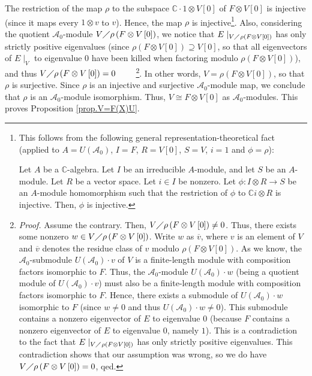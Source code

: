 \documentclass[etingof-lie.tex]{subfiles}
\begin{document}
The restriction of the map $\rho$ to the subspace $\mathbb{C}\cdot1\otimes
V\left[  0\right]  $ of $F\otimes V\left[  0\right]  $ is injective (since it
maps every $1\otimes v$ to $v$). Hence, the map $\rho$ is
injective\footnote{This follows from the following general
representation-theoretical fact (applied to $A=U\left(  \mathcal{A}%
_{0}\right)  $, $I=F$, $R=V\left[  0\right]  $, $S=V$, $i=1$ and $\phi=\rho$):
\par
Let $A$ be a $\mathbb{C}$-algebra. Let $I$ be an irreducible $A$-module, and
let $S$ be an $A$-module. Let $R$ be a vector space. Let $i\in I$ be nonzero.
Let $\phi:I\otimes R\rightarrow S$ be an $A$-module homomorphism such that the
restriction of $\phi$ to $\mathbb{C}i\otimes R$ is injective. Then, $\phi$ is
injective.}. Also, considering the quotient $\mathcal{A}_{0}$-module
$V\diagup\rho\left(  F\otimes V\left[  0\right]  \right)  $, we notice that
$E\mid_{V\diagup\rho\left(  F\otimes V\left[  0\right]  \right)  }$ has only
strictly positive eigenvalues (since $\rho\left(  F\otimes V\left[  0\right]
\right)  \supseteq V\left[  0\right]  $, so that all eigenvectors of
$E\mid_{V}$ to eigenvalue $0$ have been killed when factoring modulo
$\rho\left(  F\otimes V\left[  0\right]  \right)  $), and thus $V\diagup
\rho\left(  F\otimes V\left[  0\right]  \right)  =0$%
\ \ \ \ \footnote{\textit{Proof.} Assume the contrary. Then, $V\diagup
\rho\left(  F\otimes V\left[  0\right]  \right)  \neq0$. Thus, there exists
some nonzero $w\in V\diagup\rho\left(  F\otimes V\left[  0\right]  \right)  $.
Write $w$ as $\overline{v}$, where $v$ is an element of $V$ and $\overline{v}$
denotes the residue class of $v$ modulo $\rho\left(  F\otimes V\left[
0\right]  \right)  $. As we know, the $\mathcal{A}_{0}$-submodule $U\left(
\mathcal{A}_{0}\right)  \cdot v$ of $V$ is a finite-length module with
composition factors isomorphic to $F$. Thus, the $\mathcal{A}_{0}$-module
$U\left(  \mathcal{A}_{0}\right)  \cdot w$ (being a quotient module of
$U\left(  \mathcal{A}_{0}\right)  \cdot v$) must also be a finite-length
module with composition factors isomorphic to $F$. Hence, there exists a
submodule of $U\left(  \mathcal{A}_{0}\right)  \cdot w$ isomorphic to $F$
(since $w\neq0$ and thus $U\left(  \mathcal{A}_{0}\right)  \cdot w\neq0$).
This submodule contains a nonzero eigenvector of $E$ to eigenvalue $0$
(because $F$ contains a nonzero eigenvector of $E$ to eigenvalue $0$, namely
$1$). This is a contradiction to the fact that $E\mid_{V\diagup\rho\left(
F\otimes V\left[  0\right]  \right)  }$ has only strictly positive
eigenvalues. This contradiction shows that our assumption was wrong, so we do
have $V\diagup\rho\left(  F\otimes V\left[  0\right]  \right)  =0$, qed.}. In
other words, $V=\rho\left(  F\otimes V\left[  0\right]  \right)  $, so that
$\rho$ is surjective. Since $\rho$ is an injective and surjective
$\mathcal{A}_{0}$-module map, we conclude that $\rho$ is an $\mathcal{A}_{0}%
$-module isomorphism. Thus, $V\cong F\otimes V\left[  0\right]  $ as
$\mathcal{A}_{0}$-modules. This proves Proposition \ref{prop.V=F(X)U}.
\end{document}
